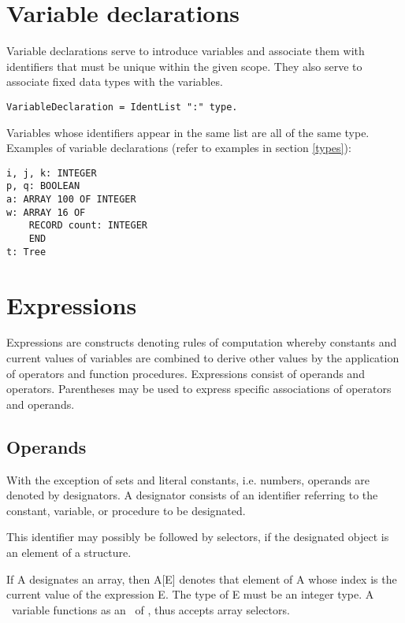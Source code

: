 \documentclass[12pt]{article}
\begin{document}
\section{Variable declarations}

Variable declarations serve to introduce variables and associate them with identifiers that must be unique within the given scope. They also serve to associate fixed data types with the variables.

\begin{lstlisting}[style=ebnf]
VariableDeclaration = IdentList ":" type.
\end{lstlisting}

Variables whose identifiers appear in the same list are all of the same type. Examples of variable declarations (refer to examples in section \ref{types}):

\begin{lstlisting}[style=example]
i, j, k: INTEGER
p, q: BOOLEAN
a: ARRAY 100 OF INTEGER
w: ARRAY 16 OF
    RECORD count: INTEGER
    END
t: Tree
\end{lstlisting}

\section{Expressions}

Expressions are constructs denoting rules of computation whereby constants and current values of variables are combined to derive other values by the application of operators and function procedures. Expressions consist of operands and operators. Parentheses may be used to express specific associations of operators and operands.

\subsection{Operands}
\label{operands}

With the exception of sets and literal constants, i.e. numbers, operands are denoted by designators. A designator consists of an identifier referring to the constant, variable, or procedure to be designated. 

This identifier may possibly be followed by selectors, if the designated object is an element of a structure.

If A designates an array, then A[E] denotes that element of A whose index is the current value of the expression E. The type of E must be an integer type. A \STRING\ variable functions as an \ARRAY\ of \CHAR, thus accepts array selectors.
\end{document}
